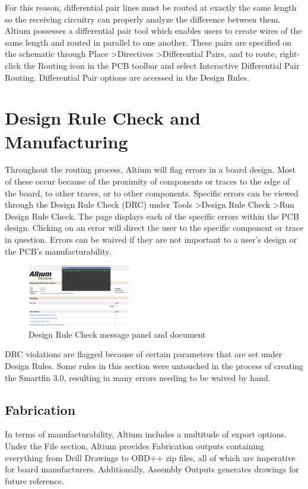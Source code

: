 \documentclass[twocolumn]{article}
\begin{document}
For this reason, differential pair lines must be routed at exactly the same length so the receiving circuitry can properly analyze the difference between them. Altium possesses a differential pair tool which enables users to create wires of the same length and routed in parallel to one another. These pairs are specified on the schematic through Place \textgreater Directives \textgreater Differential Pairs, and to route, right-click the Routing icon in the PCB toolbar and select Interactive Differential Pair Routing. Differential Pair options are accessed in the Design Rules.

\section{Design Rule Check and Manufacturing}

Throughout the routing process, Altium will flag errors in a board design. Most of these occur because of the proximity of components or traces to the edge of the board, to other traces, or to other components. Specific errors can be viewed through the Design Rule Check (DRC) under Tools \textgreater Design Rule Check \textgreater Run Design Rule Check. The page displays each of the specific errors within the PCB design. Clicking on an error will direct the user to the specific component or trace in question. Errors can be waived if they are not important to a user's design or the PCB's manufacturability.

\begin{figure}[ht]
    \centering
    \includegraphics[width=0.4\textwidth]{DRC.png}
    \caption{Design Rule Check message panel and document}
    \label{fig:DRC}
\end{figure}

DRC violations are flagged because of certain parameters that are set under Design Rules. Some rules in this section were untouched in the process of creating the Smartfin 3.0, resulting in many errors needing to be waived by hand.

\subsection{Fabrication}
In terms of manufacturability, Altium includes a multitude of export options. Under the File section, Altium provides Fabrication outputs containing everything from Drill Drawings to OBD++ zip files, all of which are imperative for board manufacturers. Additionally, Assembly Outputs generates drawings for future reference.
\end{document}
